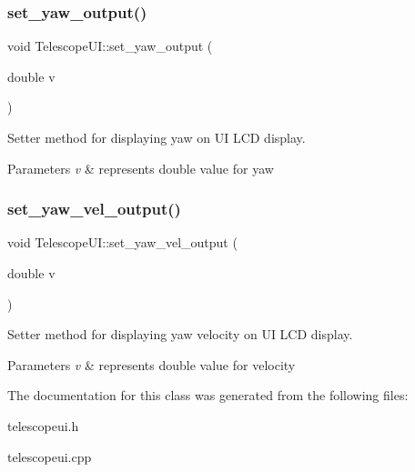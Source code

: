 \subsubsection{\texorpdfstring{set\+\_\+yaw\+\_\+output()}{set\_yaw\_output()}}
{\footnotesize\ttfamily void Telescope\+U\+I\+::set\+\_\+yaw\+\_\+output (\begin{DoxyParamCaption}\item[{double}]{v }\end{DoxyParamCaption})}



Setter method for displaying yaw on UI \textquotesingle{}L\+CD display\textquotesingle{}. 


\begin{DoxyParams}{Parameters}
{\em v} & represents double value for yaw \\
\hline
\end{DoxyParams}
\mbox{\label{classTelescopeUI_aa606620872e1d9402b74c26664d12c3d}} 
\subsubsection{\texorpdfstring{set\+\_\+yaw\+\_\+vel\+\_\+output()}{set\_yaw\_vel\_output()}}
{\footnotesize\ttfamily void Telescope\+U\+I\+::set\+\_\+yaw\+\_\+vel\+\_\+output (\begin{DoxyParamCaption}\item[{double}]{v }\end{DoxyParamCaption})}



Setter method for displaying yaw velocity on UI \textquotesingle{}L\+CD display\textquotesingle{}. 


\begin{DoxyParams}{Parameters}
{\em v} & represents double value for velocity \\
\hline
\end{DoxyParams}


The documentation for this class was generated from the following files\+:\begin{DoxyCompactItemize}
\item 
telescopeui.\+h\item 
telescopeui.\+cpp\end{DoxyCompactItemize}
